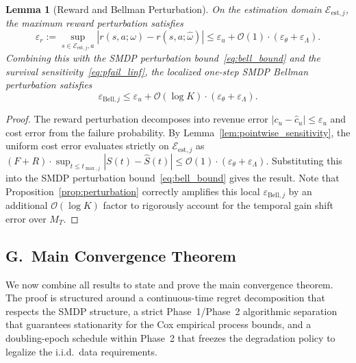 \documentclass[letterpaper, 10 pt, conference]{IEEEconf}
\newtheorem{lemma}{Lemma}
\newcommand{\what}[1]{\widehat{#1}}
\begin{document}
\begin{lemma}[Reward and Bellman Perturbation]
    \label{lem:reward_perturbation}
    On the estimation domain $\mathcal{E}_{\mathrm{est},j}$, the maximum reward perturbation satisfies
    \begin{equation}
        \varepsilon_r := \sup_{s \in \mathcal{E}_{\mathrm{est},j}, a} |r(s, a; \omega) - r(s, a; \what{\omega})| \leq \varepsilon_u + \mathcal{O}(1) \cdot (\varepsilon_\theta + \varepsilon_\Lambda).
    \end{equation}
    Combining this with the SMDP perturbation bound~\eqref{eq:bell_bound} and the survival sensitivity~\eqref{eq:pfail_linf}, the localized one-step SMDP Bellman perturbation satisfies
    \begin{equation}
        \label{eq:bell_total}
        \varepsilon_{\mathrm{Bell},j} \leq \varepsilon_u + \mathcal{O}(\log K) \cdot (\varepsilon_\theta + \varepsilon_\Lambda).
    \end{equation}
\end{lemma}

\begin{proof}
    The reward perturbation decomposes into revenue error $|c_u - \what{c}_u| \leq \varepsilon_u$ and cost error from the failure probability. By Lemma~\ref{lem:pointwise_sensitivity}, the uniform cost error evaluates strictly on $\mathcal{E}_{\mathrm{est},j}$ as $(F+R) \cdot \sup_{t \le t_{\max,j}} |S(t) - \what{S}(t)| \le \mathcal{O}(1) \cdot (\varepsilon_\theta + \varepsilon_\Lambda)$. Substituting this into the SMDP perturbation bound~\eqref{eq:bell_bound} gives the result. Note that Proposition~\ref{prop:perturbation} correctly amplifies this local $\varepsilon_{\mathrm{Bell},j}$ by an additional $\mathcal{O}(\log K)$ factor to rigorously account for the temporal gain shift error over $M_T$.
\end{proof}


\subsection*{G.~Main Convergence Theorem}
\label{sec:app_main}

We now combine all results to state and prove the main convergence theorem. The proof is structured around a continuous-time regret decomposition that respects the SMDP structure, a strict Phase~1/Phase~2 algorithmic separation that guarantees stationarity for the Cox empirical process bounds, and a doubling-epoch schedule within Phase~2 that freezes the degradation policy to legalize the i.i.d.\ data requirements.
\end{document}

